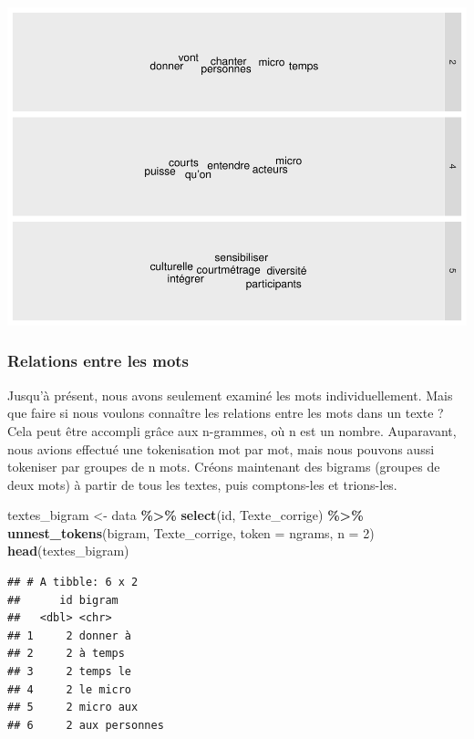 \documentclass[
]{article}
\newenvironment{Shaded}{\begin{snugshade}}{\end{snugshade}}
\newcommand{\AttributeTok}[1]{\textcolor[rgb]{0.13,0.29,0.53}{#1}}
\newcommand{\DecValTok}[1]{\textcolor[rgb]{0.00,0.00,0.81}{#1}}
\newcommand{\FunctionTok}[1]{\textcolor[rgb]{0.13,0.29,0.53}{\textbf{#1}}}
\newcommand{\NormalTok}[1]{#1}
\newcommand{\OtherTok}[1]{\textcolor[rgb]{0.56,0.35,0.01}{#1}}
\newcommand{\SpecialCharTok}[1]{\textcolor[rgb]{0.81,0.36,0.00}{\textbf{#1}}}
\newcommand{\StringTok}[1]{\textcolor[rgb]{0.31,0.60,0.02}{#1}}
\begin{document}
\includegraphics{Texte_mining_files/figure-latex/unnamed-chunk-18-1.pdf}

\subsubsection{Relations entre les mots}\label{relations-entre-les-mots}

Jusqu'à présent, nous avons seulement examiné les mots individuellement.
Mais que faire si nous voulons connaître les relations entre les mots
dans un texte ? Cela peut être accompli grâce aux n-grammes, où n est un
nombre. Auparavant, nous avions effectué une tokenisation mot par mot,
mais nous pouvons aussi tokeniser par groupes de n mots. Créons
maintenant des bigrams (groupes de deux mots) à partir de tous les
textes, puis comptons-les et trions-les.

\begin{Shaded}
\begin{Highlighting}[]
\NormalTok{textes\_bigram }\OtherTok{\textless{}{-}}\NormalTok{ data }\SpecialCharTok{\%\textgreater{}\%}
  \FunctionTok{select}\NormalTok{(id, Texte\_corrige) }\SpecialCharTok{\%\textgreater{}\%}
  \FunctionTok{unnest\_tokens}\NormalTok{(bigram, Texte\_corrige, }\AttributeTok{token =} \StringTok{\textquotesingle{}ngrams\textquotesingle{}}\NormalTok{, }\AttributeTok{n =} \DecValTok{2}\NormalTok{) }
\FunctionTok{head}\NormalTok{(textes\_bigram)}
\end{Highlighting}
\end{Shaded}

\begin{verbatim}
## # A tibble: 6 x 2
##      id bigram       
##   <dbl> <chr>        
## 1     2 donner à     
## 2     2 à temps      
## 3     2 temps le     
## 4     2 le micro     
## 5     2 micro aux    
## 6     2 aux personnes
\end{verbatim}
\end{document}
